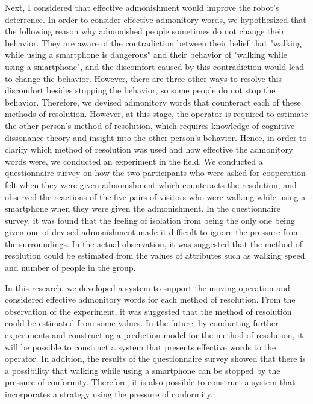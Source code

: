 \documentclass{kuisthesis}
\begin{document}
\begin{eabstract}
Next, I considered that effective admonishment would improve the robot's deterrence.
In order to consider effective admonitory words, we hypothesized that the following reason why admonished people sometimes do not change their behavior.
They are aware of the contradiction between their belief that "walking while using a smartphone is dangerous" and their behavior of "walking while using a smartphone", and the discomfort caused by this contradiction would lead to change the behavior.
However, there are three other ways to resolve this discomfort besides stopping the behavior, so some people do not stop the behavior.
Therefore, we devised admonitory words that counteract each of these methods of resolution.
However, at this stage, the operator is required to estimate the other person's method of resolution, which requires knowledge of cognitive dissonance theory and insight into the other person's behavior.
Hence, in order to clarify which method of resolution was used and how effective the admonitory words were, we conducted an experiment in the field.
We conducted a questionnaire survey on how the two participants who were asked for cooperation felt when they were given admonishment which counteracts the resolution, and observed the reactions of the five pairs of visitors who were walking while using a smartphone when they were given the admonishment.
In the questionnaire survey, it was found that the feeling of isolation from being the only one being given one of devised admonishment  made it difficult to ignore the pressure from the surroundings.
In the actual observation, it was suggested that the method of resolution could be estimated from the values of attributes such as walking speed and number of people in the group.

In this research, we developed a system to support the moving operation and considered effective admonitory words for each method of resolution.
From the observation of the experiment, it was suggested that the method of resolution could be estimated from some values.
In the future, by conducting further experiments and constructing a prediction model for the method of resolution, it will be possible to construct a system that presents effective words to the operator.
In addition, the results of the questionnaire survey showed that there is a possibility that walking while using a smartphone can be stopped by the pressure of conformity.
Therefore, it is also possible to construct a system that incorporates a strategy using the pressure of conformity.
\end{eabstract}
\end{document}
